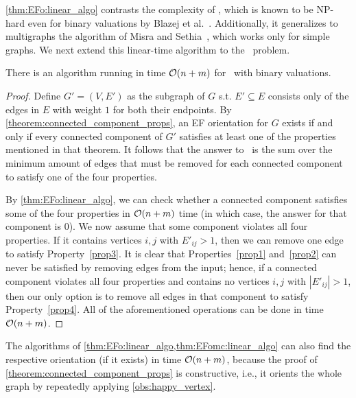 \cref{thm:EFo:linear_algo} contrasts the complexity of \EFXo, which is known to be NP-hard even for binary valuations by Blazej et al.~\cite{sagt/BlazejGRS25}.
Additionally, it generalizes to multigraphs the algorithm of Misra and Sethia~\cite{aldt/MisraS24}, which works only for simple graphs.
We next extend this linear-time algorithm to the \EFmc\ problem.


\begin{theoremrep}[\appsymb]\label{thm:EFomc:linear_algo}
    There is an algorithm running in time $\mathcal{O}(n+m)$ for \EFmc\ with binary valuations.
\end{theoremrep}

\begin{proof}
    Define $G'=(V,E')$ as the subgraph of $G$ s.t. $E'\subseteq E$ consists only of the edges in $E$ with weight $1$ for both their endpoints. By \cref{theorem:connected_component_props}, an EF orientation for $G$ exists if and only if every connected component of $G'$ satisfies at least one of the properties mentioned in that theorem. It follows that the answer to \EFmc\ is the sum over the minimum amount of edges that must be removed for each connected component to satisfy one of the four properties.

    By \cref{thm:EFo:linear_algo}, we can check whether a connected component satisfies some of the four properties in $\mathcal{O}(n+m)$ time (in which case, the answer for that component is $0$). We now assume that some component violates all four properties. If it contains vertices $i,j$ with $E'_{ij}>1$, then we can remove one edge to satisfy Property~\ref{prop3}. It is clear that Properties~\ref{prop1} and~\ref{prop2} can never be satisfied by removing edges from the input; hence, if a connected component violates all four properties and contains no vertices $i,j$ with $|E'_{ij}|>1$, then our only option is to remove all edges in that component to satisfy Property~\ref{prop4}. All of the aforementioned operations can be done in time $\mathcal{O}(n+m)$.
\end{proof}

\begin{remark}
    The algorithms of \cref{thm:EFo:linear_algo,thm:EFomc:linear_algo} can also find the respective orientation (if it exists) in time $\mathcal{O}(n+m)$, because the proof of \cref{theorem:connected_component_props} is constructive, i.e., it orients the whole graph by repeatedly applying \cref{obs:happy_vertex}.
\end{remark}




